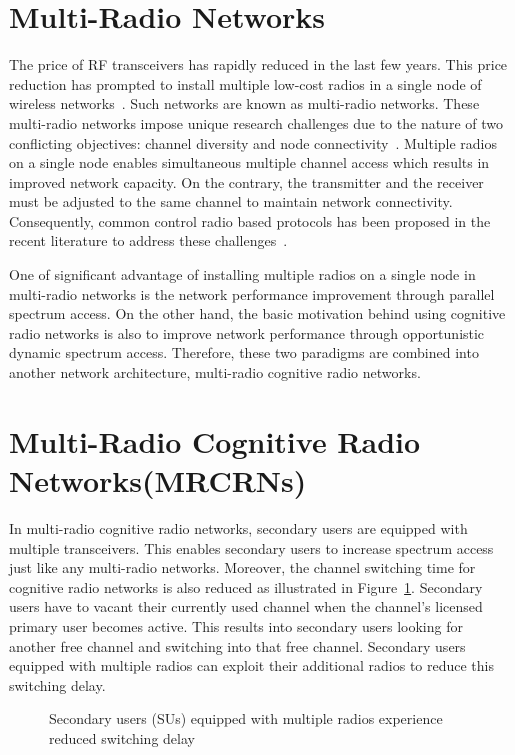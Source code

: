 \section{Multi-Radio Networks}

The price of RF transceivers has rapidly reduced in the last few years. This price reduction has prompted to install multiple low-cost radios in a single node of wireless networks~\cite{raniwala2005architecture}. Such networks are known as multi-radio networks. These multi-radio networks impose unique research challenges due to the nature of two conflicting objectives: channel diversity and node connectivity~\cite{wang2007survey}. Multiple radios on a single node enables simultaneous multiple channel access which results in improved network capacity. On the contrary, the transmitter and the receiver must be adjusted to the same channel to maintain network connectivity. Consequently, common control radio based protocols has been proposed in the recent literature to address these challenges~\cite{ko2007distributed, al2016channel, gabale2013classification, kyasanur2006routing, chatterjee2013low}.

One of significant advantage of installing multiple radios on a single node in multi-radio networks is the network performance improvement through parallel spectrum access. On the other hand, the basic motivation behind using cognitive radio networks is also to improve network performance through opportunistic dynamic spectrum access. Therefore, these two paradigms are combined into another network architecture, multi-radio cognitive radio networks. 

\section{Multi-Radio Cognitive Radio Networks(MRCRNs)}
In multi-radio cognitive radio networks, secondary users are equipped with multiple transceivers. This enables secondary users to increase spectrum access just like any multi-radio networks. Moreover, the channel switching time for cognitive radio networks is also reduced as illustrated in Figure~\ref{fig:switchingDelay}. Secondary users have to vacant their currently used channel when the channel's licensed primary user becomes active. This results into secondary users looking for another free channel and switching into that free channel. Secondary users equipped with multiple radios can exploit their additional radios to reduce this switching delay.

\begin{figure}[!htbp]
\begin{center}
    
    \caption{Secondary users (SUs) equipped with multiple radios experience reduced switching delay}
    \label{fig:switchingDelay}
\end{center}
\end{figure}

